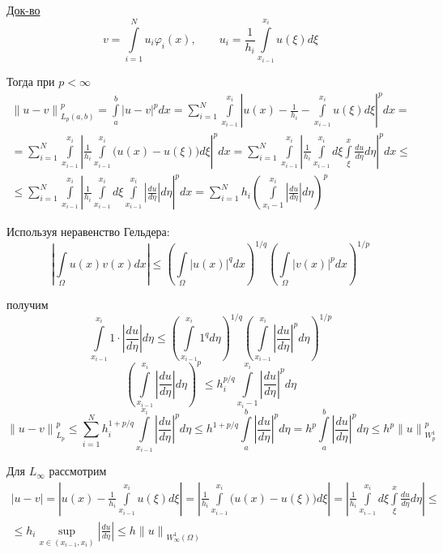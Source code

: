 \documentclass[12pt, a4paper]{article}
\newcommand{\Int}{\int\limits}
\newcommand{\Sum}{\sum\limits}
\begin{document}
\underline{Док-во}
\[ v = \Int_{i=1}^{N} u_i \varphi_i(x), \qquad u_i = \frac{1}{h_i} \Int_{x_{i-1}}^{x_i} u(\xi)d \xi \]

Тогда при $p < \infty$
\begin{multline*}
	{\|u-v\|}^p_{L_p(a,b)} = \Int_{a}^{b} {|u - v|}^p dx = \Sum_{i=1}^{N} \Int_{x_{i-1}}^{x_i} {\left|u(x) - \frac{1}{h_i} - \Int_{x_{i-1}}^{x_i} u (\xi) d \xi \right|}^p dx = \\
	= \Sum_{i=1}^{N} \Int_{x_{i-1}}^{x_i} {\left| \frac{1}{h_i} \Int_{x_{i-1}}^{x_i} \bigl( u(x) - u(\xi) \bigr) d\xi \right|}^p dx = \Sum_{i=1}^{N} \Int_{x_{i-1}}^{x_i} {\left| \frac{1}{h_i} \Int_{x_{i-1}}^{x_i} d \xi \Int_{\xi}^{x} \frac{du}{d\eta} d \eta \right|}^p dx \leq \\
	\leq \Sum_{i=1}^{N} \Int_{x_{i-1}}^{x_i}{ \left| \frac{1}{h_i} \Int_{x_{i-1}}^{x_i} d \xi \Int_{x_{i-1}}^{x_i} \left| \frac{du}{d\eta} \right| d \eta \right|}^p dx = \Sum_{i=1}^{N} h_i {\left( \Int_{x_i-1}^{x_i} \left| \frac{du}{d\eta} \right| d \eta \right)}^p
\end{multline*}

Используя неравенство Гельдера:
\[ \left| \Int_{\Omega}^{} u(x) v(x) dx \right| \leq {\left( \Int_{\Omega}^{} {|u(x)|}^q dx \right)}^{1/q} {\left( \Int_{\Omega}^{} {|v(x)|}^p dx \right)}^{1/p} \]

получим
\[ \Int_{x_{i-1}}^{x_i} 1 \cdot \left|\frac{du}{d\eta}\right| d\eta \leq {\left( \Int_{x_{i-1}}^{x_i} {1}^q d \eta \right)}^{1/q} {\left( \Int_{x_{i-1}}^{x_i} {\left| \frac{du}{d \eta} \right|}^p d \eta \right)}^{1/p} \]
\[ {\left(\Int_{x_{i-1}}^{x_i} \left| \frac{du}{d\eta} \right| d\eta \right)}^p \leq h^{p/q}_i \Int_{x_i-1}^{x_i} {\left|\frac{du}{d\eta}\right|}^p d\eta \]
\[ {\|u-v\|}^p_{L_p} \leq \Sum_{i=1}^{N} h_i^{1+p/q} \Int_{x_{i-1}}^{x_i} {\left|\frac{du}{d\eta}\right|}^p  d\eta \leq h^{1+p/q} \Int_{a}^{b} {\left|\frac{du}{d\eta}\right|}^p d\eta = h^p \Int_{a}^{b} {\left|\frac{du}{d\eta}\right|}^p d\eta \leq h^p {\|u\|}^p_{W_p^1} \]

Для $L_{\infty}$ рассмотрим
\begin{multline*}
	|u - v| = \left| u(x) - \frac{1}{h_i} \Int_{x_{i-1}}^{x_i} u(\xi) d\xi \right| = \left| \frac{1}{h_i} \Int_{x_{i-1}}^{x_i} \bigl( u(x)- u(\xi) \bigr) d\xi \right| = \left| \frac{1}{h_i} \Int_{x_{i-1}}^{x_i} d\xi \Int_{\xi}^{x} \frac{du}{d\eta} d \eta \right| \leq \\
	\leq h_i \underset{x \in (x_{i-1}, x_i)}{\sup} \left| \frac{du}{d\eta} \right| \leq h {\|u\|}_{W_{\infty}^1(\Omega)}
\end{multline*}
\end{document}
